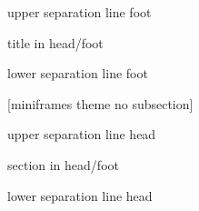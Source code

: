 {%
    \begin{beamercolorbox}[colsep=1.5pt]{upper separation line foot}
    \end{beamercolorbox}
    \begin{beamercolorbox}[ht=2.5ex,dp=1.125ex,%
            leftskip=.3cm,rightskip=.3cm plus1fil]{title in head/foot}%
        {\insertshorttitle}%
        \hfill%
        {\insertframenumber~\frameofframes~\inserttotalframenumber}
    \end{beamercolorbox}%
    \begin{beamercolorbox}[colsep=1.5pt]{lower separation line foot}
    \end{beamercolorbox}
}
[miniframes theme no subsection]
{%
    \begin{beamercolorbox}[colsep=1.5pt]{upper separation line head}
    \end{beamercolorbox}
    \begin{beamercolorbox}{section in head/foot}
        \vskip2pt\insertnavigation{\paperwidth}\vskip2pt
    \end{beamercolorbox}%
    \begin{beamercolorbox}[colsep=1.5pt]{lower separation line head}
    \end{beamercolorbox}
}

\makeatother
